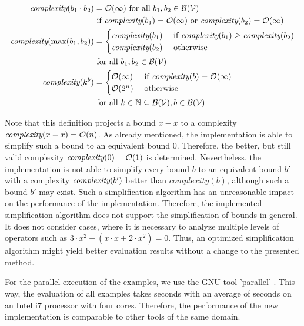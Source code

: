 \begin{definition}
\begin{align*}
    \emph{complexity}(b_1 \cdot b_2) &= \mathcal{O}(\infty) \text{ for all } b_1, b_2 \in \mathcal{B}(\mathcal{V}) \\
    & \text{ if } \emph{complexity}(b_1)=\mathcal{O}(\infty) \text{ or } \emph{complexity}(b_2)=\mathcal{O}(\infty) \\
    \emph{complexity}(\max(b_1, b_2)) &=
    \begin{cases}
      \emph{complexity}(b_1) & \text{ if } \emph{complexity}(b_1) \geq \emph{complexity}(b_2) \\
      \emph{complexity}(b_2) & \text{ otherwise }
    \end{cases} \\
    & \text{ for all } b_1, b_2 \in \mathcal{B}(\mathcal{V}) \\
    \emph{complexity}(k^b) &=
    \begin{cases}
      \mathcal{O}(\infty) & \text{ if } \emph{complexity}(b)=\mathcal{O}(\infty) \\
      \mathcal{O}(2^n) & \text{ otherwise }
    \end{cases} \\
    & \text{ for all } k \in \mathbb{N} \subseteq \mathcal{B}(\mathcal{V}), b \in \mathcal{B}(\mathcal{V}) \\
  \end{align*}
\end{definition}

Note that this definition projects a bound $x-x$ to a complexity $\emph{complexity}(x-x) = \mathcal{O}(n)$.
As already mentioned, the implementation is able to simplify such a bound to an equivalent bound $0$.
Therefore, the better, but still valid complexity $\emph{complexity}(0) = \mathcal{O}(1)$ is determined.
Nevertheless, the implementation is not able to simplify every bound $b$ to an equivalent bound $b'$ with a complexity $\emph{complexity}(b')$ better than $complexity(b)$, although such a bound $b'$ may exist.
Such a simplification algorithm has an unreasonable impact on the performance of the implementation.
Therefore, the implemented simplification algorithm does not support the simplification of bounds in general.
It does not consider cases, where it is necessary to analyze multiple levels of operators such as $3 \cdot x^2-(x \cdot x+2 \cdot x^2) = 0$.
Thus, an optimized simplification algorithm might yield better evaluation results without a change to the presented method.

For the parallel execution of the examples, we use the GNU tool 'parallel' \cite{gnuparallel}.
This way, the evaluation of all examples takes  seconds with an average of  seconds on an Intel i7 processor with four cores.
Therefore, the performance of the new implementation is comparable to other tools of the same domain.

